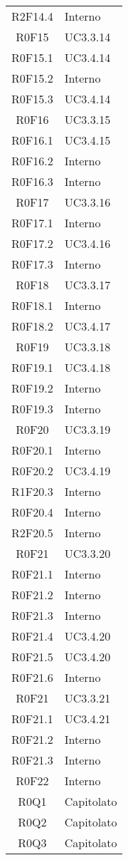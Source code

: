 \begin{center}
\begin{longtable}{ c m{3cm} }
   R2F14.4 & Interno \\
   R0F15 & UC3.3.14 \\
   R0F15.1 & UC3.4.14 \\
   R0F15.2 & Interno \\
   R0F15.3 & UC3.4.14 \\
   R0F16 & UC3.3.15 \\
   R0F16.1 & UC3.4.15 \\
   R0F16.2 & Interno \\
   R0F16.3 & Interno \\
   R0F17 & UC3.3.16 \\
   R0F17.1 & Interno \\
   R0F17.2 & UC3.4.16 \\
   R0F17.3 & Interno \\
   R0F18 & UC3.3.17 \\
   R0F18.1 & Interno \\
   R0F18.2 & UC3.4.17 \\
   R0F19 & UC3.3.18 \\
   R0F19.1 & UC3.4.18 \\
   R0F19.2 & Interno \\
   R0F19.3 & Interno \\
   R0F20 & UC3.3.19 \\
   R0F20.1 & Interno \\
   R0F20.2 & UC3.4.19 \\
   R1F20.3 & Interno \\
   R0F20.4 & Interno \\
   R2F20.5 & Interno \\
   R0F21 & UC3.3.20 \\
   R0F21.1 & Interno \\
   R0F21.2 & Interno \\
   R0F21.3 & Interno \\
   R0F21.4 & UC3.4.20 \\
   R0F21.5 & UC3.4.20 \\
   R0F21.6 & Interno \\
   R0F21 & UC3.3.21 \\
   R0F21.1 & UC3.4.21 \\
   R0F21.2 & Interno \\
   R0F21.3 & Interno \\
   R0F22 & Interno\\
   R0Q1 & Capitolato \\
   R0Q2 & Capitolato \\
   R0Q3 & Capitolato \\

\end{longtable}
\end{center}
